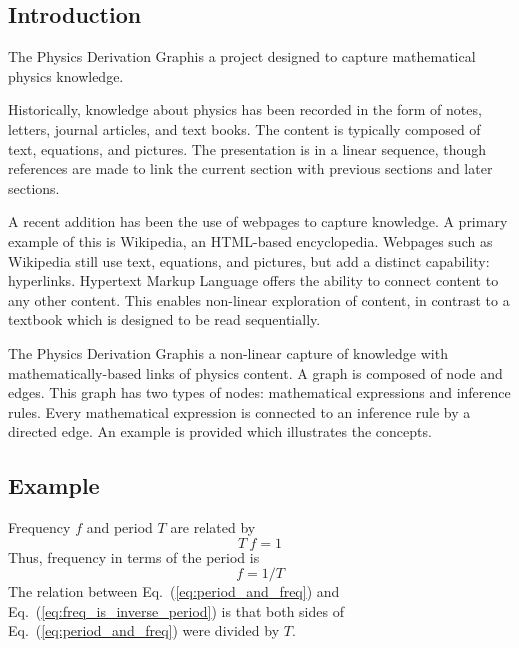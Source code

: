 \documentclass{article}
\newcommand{\eqn}[1]{Eq.\ (\ref{#1})}
\newcommand{\pdg}{Physics Derivation Graph}
\begin{document}
\begin{multicols}{2}

\tableofcontents



\section{Introduction\label{sec:intro}}

The \pdg is a project designed to capture mathematical physics knowledge. 

Historically, knowledge about physics has been recorded in the form of notes, letters, journal articles, and text books. The content is typically composed of text, equations, and pictures. The presentation is in a linear sequence, though references are made to link the current section with previous sections and later sections. 

A recent addition has been the use of webpages to capture knowledge. A primary example of this is Wikipedia, an HTML-based encyclopedia. Webpages such as Wikipedia still use text, equations, and pictures, but add a distinct capability: hyperlinks. Hypertext Markup Language offers the ability to connect content to any other content. This enables non-linear exploration of content, in contrast to a textbook which is designed to be read sequentially. 

The \pdg is a non-linear capture of knowledge with mathematically-based links of physics content. A graph is composed of node and edges. This graph has two types of nodes: mathematical expressions and inference rules. Every mathematical expression is connected to an inference rule by a directed edge. An example is provided which illustrates the concepts.

\subsection{Example\label{sec:example}}

Frequency $f$ and period $T$ are related by
\begin{equation}
T\ f = 1
\label{eq:period_and_freq}
\end{equation}
Thus, frequency in terms of the period is
\begin{equation}
f = 1/T
\label{eq:freq_is_inverse_period}
\end{equation}
The relation between \eqn{eq:period_and_freq} and \eqn{eq:freq_is_inverse_period} is that both sides of \eqn{eq:period_and_freq} were divided by $T$. 


\end{multicols}
\end{document}
